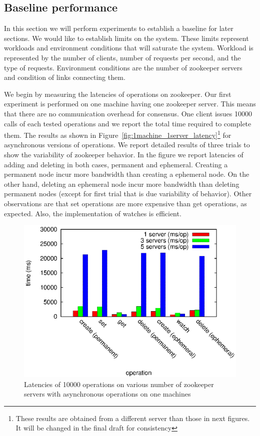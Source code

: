 \subsection{Baseline performance}
 In this section we will perform experiments to establish a baseline for later sections. We would like to establish limits on the system. These limits represent workloads and environment conditions that will saturate the system. Workload is represented by the number of clients, number of requests per second, and the type of requests. Environment conditions are the number of zookeeper servers and condition of links connecting them.

We begin by measuring the latencies of operations on zookeeper. Our first experiment is performed on one machine having one zookeeper server. This means that there are no communication overhead for consensus. One client issues 10000 calls of each tested operations and we report the total time required to complete them. The results as shown in Figure~\ref{fig:1machine_1server_latency}\footnote{These results are obtained from a different server than those in next figures. It will be changed in the final draft for consistency} for asynchronous versions of operations. We report detailed results of three trials to show the variability of zookeeper behavior. In the figure we report latencies of adding and deleting in both cases, permanent and ephemeral. Creating a permanent node incur more bandwidth than creating a ephemeral node. On the other hand, deleting an ephemeral node incur more bandwidth than deleting permanent nodes (except for first trial that is due variability of behavior). Other observations are that set operations are more expensive than get operations, as expected. Also, the implementation of watches is efficient.

\begin{figure}[h]
\centering
\includegraphics[scale=0.75]{img/1_machine_diff_cpu.eps}
\caption{Latencies of 10000 operations on various number of zookeeper servers with asynchronous operations on one machines}
\label{fig:1machine_diffcpu_latency}
\end{figure}

